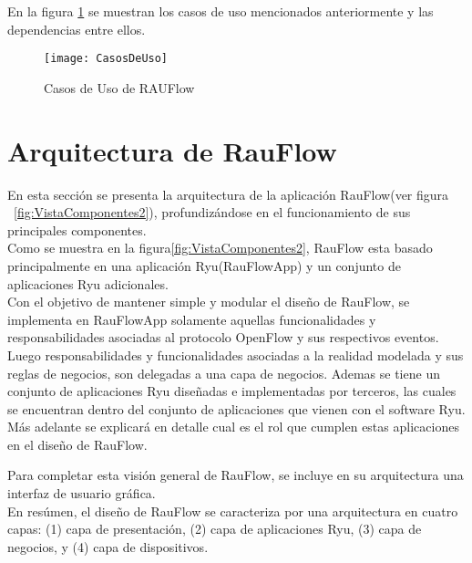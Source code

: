 En la figura \ref{fig:CasosDeUso} se muestran los casos de uso mencionados anteriormente y las dependencias entre ellos.

\begin{figure}[ht!] 
\centering    
\texttt{[image: CasosDeUso]}
\caption[Casos de Uso de RAUFlow]{Casos de Uso de RAUFlow}
\label{fig:CasosDeUso}
\end{figure}

\newpage
\section[Arquitectura de RauFlow]{Arquitectura de RauFlow}

En esta secci\'on se presenta la arquitectura de la aplicación RauFlow(ver figura ~\ref{fig:VistaComponentes2}), profundizándose en el funcionamiento de sus principales componentes.\\

Como se muestra en la figura\ref{fig:VistaComponentes2}, RauFlow esta basado principalmente en una aplicaci\'on Ryu(RauFlowApp) y un conjunto de aplicaciones Ryu adicionales.\\ 

Con el objetivo de mantener simple y modular el dise\~no de RauFlow, se implementa en RauFlowApp solamente aquellas funcionalidades y responsabilidades asociadas al protocolo OpenFlow y sus respectivos eventos. Luego responsabilidades y funcionalidades asociadas a la realidad modelada y sus reglas de negocios, son delegadas a una capa de negocios. Ademas se tiene un conjunto de aplicaciones Ryu dise\~nadas e implementadas por terceros, las cuales se encuentran dentro del conjunto de aplicaciones que vienen con el software Ryu. M\'as adelante se explicar\'a en detalle cual es el rol que cumplen estas aplicaciones en el dise\~no de RauFlow.

Para completar esta visi\'on general de RauFlow, se incluye en su arquitectura una interfaz de usuario gr\'afica.\\ 

En res\'umen, el dise\~no de RauFlow se caracteriza por una arquitectura en cuatro capas: (1) capa de presentación, (2) capa de aplicaciones Ryu, (3) capa de negocios, y (4) capa de dispositivos.\\

